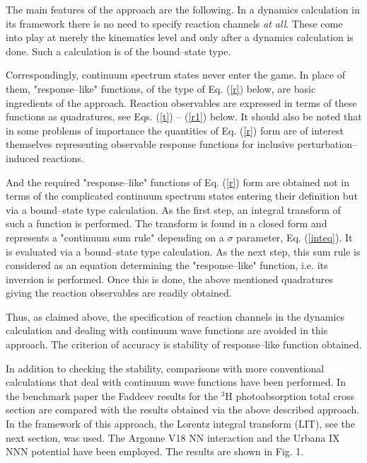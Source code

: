 \documentclass[12pt,ams,preprint,a4paper]{revtex4}
\begin{document}
The  main features of the approach
are the following. In a dynamics calculation in its framework
there is no need  to specify reaction channels {\it at all}. 
These come into play at merely the kinematics level and only
 after a dynamics calculation is done. Such a calculation 
is of the
bound--state type. 


Correspondingly, continuum spectrum 
states never enter the game. In place of them, "response--like" functions, 
of the type of Eq. (\ref{r}) below, are 
basic ingredients of the approach. Reaction observables are expressed in terms of these
functions
 as quadratures, see Eqs. (\ref{t}) -- (\ref{r1}) below. It should  also be 
noted that in some problems of importance the quantities of Eq. (\ref{r}) form are of interest 
themselves representing observable response 
functions for inclusive perturbation--induced reactions.

And the required "response--like" functions of Eq. (\ref{r}) form are 
obtained not in terms of  the complicated continuum spectrum 
states  entering their definition but via a 
bound--state type calculation. As the first step, an integral transform of such a
function
is performed. The transform is found in a closed form and 
represents a "continuum sum rule" depending on a $\sigma$ parameter,
Eq. (\ref{inteq}). It is evaluated via a bound--state type calculation. As the next step, this sum rule
is considered as an equation determining the "response--like" function, i.e. its inversion is performed.
Once this is done, the above mentioned quadratures giving the reaction observables are readily
obtained.



Thus, as claimed above, the specification of reaction channels in the dynamics calculation
and dealing with continuum wave functions are avoided in this approach. The criterion of accuracy 
is stability of response--like function obtained. 

In addition to checking the stability,
 comparisons with more conventional calculations that deal with continuum wave 
functions have been performed. In the benchmark paper \cite{gloeckle} the Faddeev results for
the $^3$H photoabsorption total cross section are compared with the results \cite{np} obtained via
the above described approach. In the framework of this approach, the Lorentz integral transform (LIT), 
see the next section, was used. The Argonne V18 NN interaction and 
the Urbana IX NNN potential have been employed. The results are shown in Fig. 1. 
\end{document}
